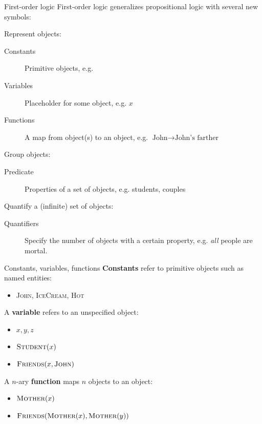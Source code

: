 \documentclass[usenames,dvipsnames,notes,11pt,aspectratio=169]{beamer}
\begin{document}
\begin{frame}
    {First-order logic}
    First-order logic generalizes propositional logic with several new symbols:

    Represent objects:\\
            \begin{description}
                \item[Constants] Primitive objects, e.g. 
                \item[Variables] Placeholder for some object, e.g. $x$
                \item[Functions] A map from object(s) to an object, e.g. $\text{John} \rightarrow \text{John's farther}$
            \end{description}

    Group objects:\\
    \begin{description}
        \item[Predicate] Properties of a set of objects, e.g. students, couples
    \end{description}

    Quantify a (infinite) set of objects:\\
    \begin{description}
        \item[Quantifiers] Specify the number of objects with a certain property, e.g. \emph{all} people are mortal.
    \end{description}
\end{frame}

\begin{frame}
    {Constants, variables, functions}
    \textbf{Constants} refer to primitive objects such as named entities:\\
    \begin{itemize}
        \item[] \textsc{John}, \textsc{IceCream}, \textsc{Hot}
    \end{itemize}

    A \textbf{variable} refers to an unspecified object:\\
    \begin{itemize}
        \item[] $x,y,z$
        \item[] $\textsc{Student}(x)$
        \item[] $\textsc{Friends}(x, \textsc{John})$
    \end{itemize}

    A $n$-ary \textbf{function} maps $n$ objects to an object:\\
    \begin{itemize}
        \item[] $\textsc{Mother}(x)$
        \item[] $\textsc{Friends}(\textsc{Mother}(x), \textsc{Mother}(y))$
    \end{itemize}
\end{frame}
\end{document}
